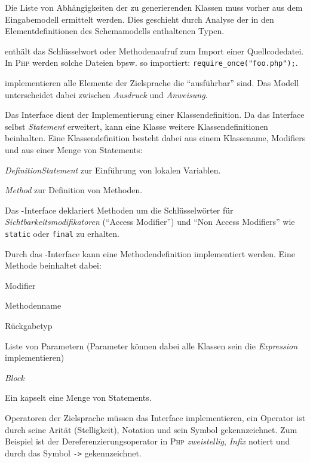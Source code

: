 Die Liste von Abhängigkeiten der zu generierenden Klassen muss vorher aus dem Eingabemodell ermittelt werden. Dies geschieht durch Analyse der in den Elementdefinitionen des Schemamodells enthaltenen Typen. 

 enthält das Schlüsselwort oder Methodenaufruf zum Import einer Quellcodedatei. In \textsc{Php} werden solche Dateien bpsw. so importiert: \texttt{require\_once("foo.php");}.

 implementieren alle Elemente der Zielsprache die \enquote{ausführbar} sind. Das Modell unterscheidet dabei zwischen \emph{Ausdruck} und \emph{Anweisung}. 

Das Interface  dient der Implementierung einer Klassendefinition. Da das Interface selbst \emph{Statement} erweitert, kann eine Klasse weitere Klassendefinitionen beinhalten. Eine Klassendefinition besteht dabei aus einem Klassename, Modifiers und aus einer Menge von Statements:
\begin{compactitem}
    \item \emph{DefinitionStatement} zur Einführung von lokalen Variablen.
    \item \emph{Method} zur Definition von Methoden.
\end{compactitem}

Das -Interface deklariert Methoden um die Schlüsselwörter für \emph{Sichtbarkeitsmodifikatoren} (\enquote{Access Modifier}) und \enquote{Non Access Modifiers} wie \texttt{static} oder \texttt{final} zu erhalten.

Durch das -Interface kann eine Methodendefinition implementiert werden. Eine Methode beinhaltet dabei:
\begin{compactitem}
    \item Modifier
    \item Methodenname
    \item Rückgabetyp
    \item Liste von Parametern (Parameter können dabei alle Klassen sein die \emph{Expression} implementieren) %
    \item \emph{Block}
\end{compactitem}

Ein  kapselt eine Menge von Statements.

Operatoren der Zielsprache müssen das Interface  implementieren, ein Operator ist durch seine Arität (Stelligkeit), Notation und sein Symbol gekennzeichnet. Zum Beispiel ist der Dereferenzierungsoperator in \textsc{Php} \emph{zweistellig}, \emph{Infix} notiert und durch das Symbol \texttt{->} gekennzeichnet.


